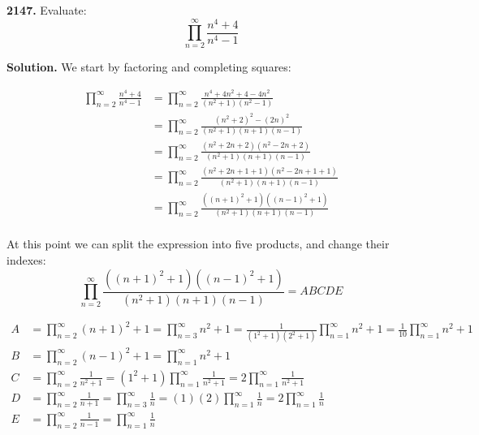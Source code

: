 \documentclass{letter}
\begin{document}
\newtheorem{lemma}{Lemma}

\begin{letter}{}

  \textbf{2147.} Evaluate:
  $$\prod_{n=2}^{\infty}\frac{n^4+4}{n^4-1}$$

  \textbf{Solution.} We start by factoring and completing squares:

\begin{align*}
\prod_{n=2}^{\infty}\frac{n^4+4}{n^4-1} &=
  \prod_{n=2}^{\infty}\frac{n^4+4n^2+4-4n^2}
  {\left(n^2+1\right)\left(n^2-1\right)} \\
  &= \prod_{n=2}^{\infty}\frac{\left(n^2+2\right)^2-\left(2n\right)^2}
  {\left(n^2+1\right)\left(n+1\right)\left(n-1\right)} \\
  &= \prod_{n=2}^{\infty}\frac{\left(n^2+2n+2\right)\left(n^2-2n+2\right)}
  {\left(n^2+1\right)\left(n+1\right)\left(n-1\right)} \\
  &= \prod_{n=2}^{\infty}\frac{\left(n^2+2n+1+1\right)\left(n^2-2n+1+1\right)}
  {\left(n^2+1\right)\left(n+1\right)\left(n-1\right)} \\
  &= \prod_{n=2}^{\infty}\frac{\left(\left(n+1\right)^2+1\right)
  \left(\left(n-1\right)^2+1\right)}
  {\left(n^2+1\right)\left(n+1\right)\left(n-1\right)} \\
\end{align*}

At this point we can split the expression into five products, and change their indexes:
$$  \prod_{n=2}^{\infty}\frac{\left(\left(n+1\right)^2+1\right)
  \left(\left(n-1\right)^2+1\right)}
  {\left(n^2+1\right)\left(n+1\right)\left(n-1\right)} = A B C D E $$

\begin{align*}
  A &= \prod_{n=2}^{\infty}\left(n+1\right)^2+1
     = \prod_{n=3}^{\infty}n^2+1
     = \frac{1}{\left(1^2+1\right)\left(2^2+1\right)}
       \prod_{n=1}^{\infty}n^2+1 
     = \frac{1}{10} \prod_{n=1}^{\infty}n^2+1 \\
  B &= \prod_{n=2}^{\infty}\left(n-1\right)^2+1
     = \prod_{n=1}^{\infty}n^2+1 \\
  C &= \prod_{n=2}^{\infty}\frac{1}{n^2+1} 
     = \left(1^2+1\right)\prod_{n=1}^{\infty}\frac{1}{n^2+1}
     = 2\prod_{n=1}^{\infty}\frac{1}{n^2+1} \\
  D &= \prod_{n=2}^{\infty}\frac{1}{n+1} 
     = \prod_{n=3}^{\infty}\frac{1}{n} 
     = \left(1\right)\left(2\right)\prod_{n=1}^{\infty}\frac{1}{n} 
     = 2\prod_{n=1}^{\infty}\frac{1}{n} \\
  E &= \prod_{n=2}^{\infty}\frac{1}{n-1} 
     = \prod_{n=1}^{\infty}\frac{1}{n} 
\end{align*}


\end{letter}
\end{document}
